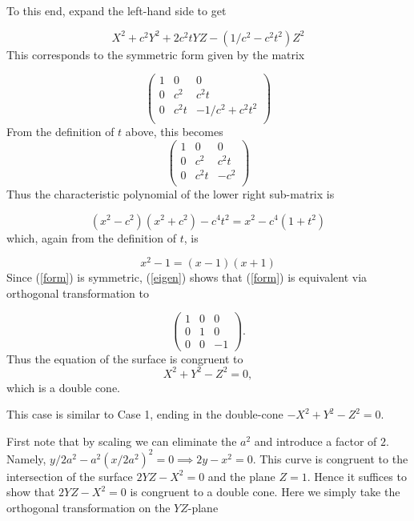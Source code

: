 \documentclass[12pt]{article}
\begin{document}
To this end, expand the left-hand side to get

$$X^2 + c^2 Y^2 + 2c^2t YZ - (1/c^2 - c^2t^2)Z^2$$
This corresponds to the symmetric form given by the matrix 

\begin{equation}\label{form}\left(
\begin{matrix} 
1 & 0 & 0 \\
0 & c^2 & c^2t \\
0 & c^2 t& -1/c^2 + c^2t^2\\
\end{matrix}
\right)
\end{equation} 
From the definition of $t$ above, this becomes
$$\left(
\begin{matrix}
1 & 0 & 0 \\
0 & c^2 & c^2 t\\
0 & c^2 t& -c^2\\
\end{matrix}
\right)$$
Thus the characteristic polynomial of the lower right sub-matrix is

$$( x^2 - c^2)(x^2 + c^2) -  c^4 t^2 = x^2 - c^4(1 + t^2)$$
which, again from the definition of $t$, is

\begin{equation}\label{eigen} x^2  -1 = (x - 1)(x + 1)\end{equation}
Since (\ref{form}) is symmetric, (\ref{eigen}) shows that (\ref{form}) is
equivalent via orthogonal transformation to

$$\left(\begin{matrix}1 & 0 & 0 \\
0 & 1 & 0\\
0 & 0 & -1\end{matrix}\right).$$
Thus the equation of the surface is congruent to
$$X^2 + Y^2 - Z^2 = 0,$$
which is a double cone.

\medskip

 This case is similar to Case 1, ending in the
double-cone $-X^2 + Y^2 - Z^2 = 0$.

\medskip

 First note that by scaling 
we can eliminate the $a^2$ and introduce a factor of $2$.  Namely,
$y/2a^2 - a^2(x/2a^2)^2  = 0\implies 2y
- x^2 = 0$.  This curve is congruent to the intersection of
the surface $2YZ - X^2 = 0$ and the plane $Z = 1$.  Hence it suffices
to show that $2YZ - X^2 = 0$ is congruent to a double cone.  
Here we simply take the orthogonal transformation on the
$YZ$-plane
\end{document}
